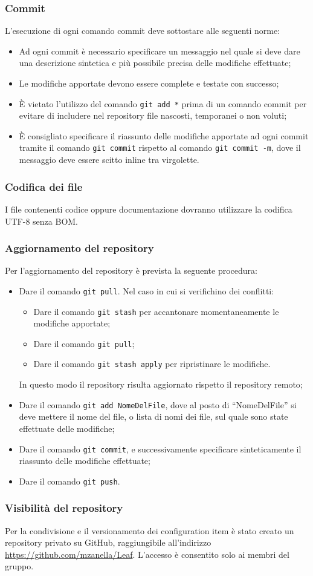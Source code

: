 	\subsubsection{Commit}
	L'esecuzione di ogni comando commit deve sottostare alle seguenti norme:
	\begin{itemize}
		\item Ad ogni commit è necessario specificare un messaggio nel quale si deve dare una descrizione sintetica e più possibile precisa delle modifiche effettuate;
		\item Le modifiche apportate devono essere complete e testate con successo;
		\item È vietato l'utilizzo del comando \texttt{git add *} prima di un comando commit per evitare di includere nel repository file nascosti, temporanei o non voluti;
		\item È consigliato specificare il riassunto delle modifiche apportate ad ogni commit tramite il comando \texttt{git commit} rispetto al comando \texttt{git commit -m}, dove il messaggio deve essere scitto inline tra virgolette.
	\end{itemize}
	\subsubsection{Codifica dei file}
	I file contenenti codice oppure documentazione dovranno utilizzare la codifica UTF-8 senza BOM.
	\subsubsection{Aggiornamento del repository}
	Per l'aggiornamento del repository è prevista la seguente procedura:
	\begin{itemize}
		\item Dare il comando \texttt{git pull}. Nel caso in cui si verifichino dei conflitti:
			\begin{itemize}
			\item Dare il comando \texttt{git stash} per accantonare momentaneamente le modifiche apportate;
			\item Dare il comando \texttt{git pull};
			\item Dare il comando \texttt{git stash apply} per ripristinare le modifiche.
			\end{itemize}
		In questo modo il repository risulta aggiornato rispetto il repository remoto;
		\item Dare il comando \texttt{git add NomeDelFile}, dove al posto di ``NomeDelFile'' si deve mettere il nome del file, o lista di nomi dei file, sul quale sono state effettuate delle modifiche;
		\item Dare il comando \texttt{git commit}, e successivamente specificare sinteticamente il riassunto delle modifiche effettuate;
		\item Dare il comando \texttt{git push}.
	\end{itemize}
	\subsubsection{Visibilità del repository}
	Per la condivisione e il versionamento dei configuration item è stato creato un repository privato su GitHub, raggiungibile all'indirizzo \url{https://github.com/mzanella/Leaf}. L'accesso è consentito solo ai membri del gruppo.
	